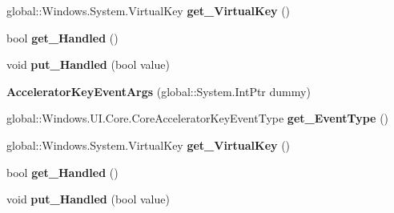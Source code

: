 \begin{DoxyCompactItemize}
global\+::\+Windows.\+System.\+Virtual\+Key {\bfseries get\+\_\+\+Virtual\+Key} ()
\item 
\mbox{\label{class_windows_1_1_u_i_1_1_core_1_1_accelerator_key_event_args_a329fc83b7d7c9686615b8d9f1f91c297}} 
bool {\bfseries get\+\_\+\+Handled} ()
\item 
\mbox{\label{class_windows_1_1_u_i_1_1_core_1_1_accelerator_key_event_args_a3d9c66a182b0cf5b679a3869603c5907}} 
void {\bfseries put\+\_\+\+Handled} (bool value)
\item 
\mbox{\label{class_windows_1_1_u_i_1_1_core_1_1_accelerator_key_event_args_af50432bf9a9aaebc40975f48537de074}} 
{\bfseries Accelerator\+Key\+Event\+Args} (global\+::\+System.\+Int\+Ptr dummy)
\item 
\mbox{\label{class_windows_1_1_u_i_1_1_core_1_1_accelerator_key_event_args_a9a5dc0ed03bd53c9e3c96ce9b323ba62}} 
global\+::\+Windows.\+U\+I.\+Core.\+Core\+Accelerator\+Key\+Event\+Type {\bfseries get\+\_\+\+Event\+Type} ()
\item 
\mbox{\label{class_windows_1_1_u_i_1_1_core_1_1_accelerator_key_event_args_a39f6aef5666a666ca9e4e71b3579144c}} 
global\+::\+Windows.\+System.\+Virtual\+Key {\bfseries get\+\_\+\+Virtual\+Key} ()
\item 
\mbox{\label{class_windows_1_1_u_i_1_1_core_1_1_accelerator_key_event_args_a329fc83b7d7c9686615b8d9f1f91c297}} 
bool {\bfseries get\+\_\+\+Handled} ()
\item 
\mbox{\label{class_windows_1_1_u_i_1_1_core_1_1_accelerator_key_event_args_a3d9c66a182b0cf5b679a3869603c5907}} 
void {\bfseries put\+\_\+\+Handled} (bool value)
\item 
\mbox{\label{class_windows_1_1_u_i_1_1_core_1_1_accelerator_key_event_args_af50432bf9a9aaebc40975f48537de074}} 

\end{DoxyCompactItemize}
